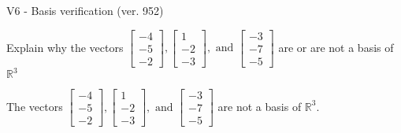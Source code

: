 \begin{exercise}
  \begin{exerciseTitle}V6 - Basis verification (ver. 952)\end{exerciseTitle}
  \begin{exerciseStatement}
    Explain why the vectors \(\left[\begin{array}{r}
-4 \\
-5 \\
-2
\end{array}\right] , \left[\begin{array}{r}
1 \\
-2 \\
-3
\end{array}\right] , \text{ and } \left[\begin{array}{r}
-3 \\
-7 \\
-5
\end{array}\right]\) are or are not a basis of \(\mathbb{R}^3\)	


  \end{exerciseStatement}
  \begin{exerciseAnswer}
   The vectors \(\left[\begin{array}{r}
-4 \\
-5 \\
-2
\end{array}\right] , \left[\begin{array}{r}
1 \\
-2 \\
-3
\end{array}\right] , \text{ and } \left[\begin{array}{r}
-3 \\
-7 \\
-5
\end{array}\right]\) 
  	 are not  a basis of \(\mathbb{R}^3\).
  


  \end{exerciseAnswer}
\end{exercise}